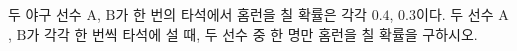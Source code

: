 두 야구 선수 $\mathrm{A}$, $\mathrm{B}$가 한 번의 타석에서 홈런을 칠 확률은 각각 $0.4$, $0.3$이다. 두 선수 $\mathrm{A}$, $\mathrm{B}$가 각각 한 번씩 타석에 설 때, 두 선수 중 한 명만 홈런을 칠 확률을 구하시오.
